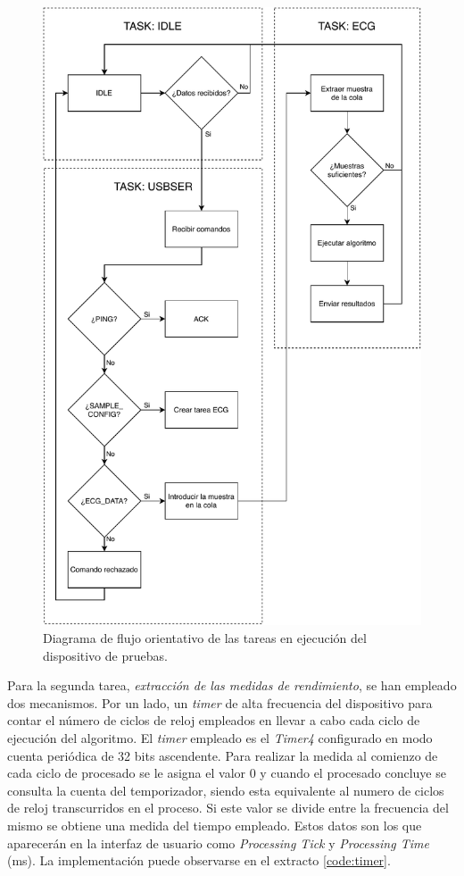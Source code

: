         \begin{figure}
                \centering
                        \includegraphics[width = 0.78 \linewidth]{figuras/TivaWorkFlow.pdf}
                \caption{Diagrama de flujo orientativo de las tareas en ejecución del dispositivo de pruebas.}
                \label{fig:tivaFlow}
        \end{figure}
        
        Para la segunda tarea, \textit{extracción de las medidas de rendimiento}, se han empleado dos mecanismos. 
        Por un lado, un \textit{timer} de alta frecuencia del dispositivo para contar el número de ciclos de reloj empleados en llevar a cabo cada ciclo de ejecución del algoritmo. El \textit{timer} empleado es el \textit{Timer4} configurado en modo cuenta periódica de 32 bits ascendente. Para realizar la medida al comienzo de cada ciclo de procesado se le asigna el valor 0 y cuando el procesado concluye se consulta la cuenta del temporizador, siendo esta equivalente al numero de ciclos de reloj transcurridos en el proceso. Si este valor se divide entre la frecuencia del mismo se obtiene una medida del tiempo empleado. Estos datos son los que aparecerán en la interfaz de usuario como \textit{Processing Tick} y \textit{Processing Time} (ms). La implementación puede observarse en el extracto \ref{code:timer}.
        
